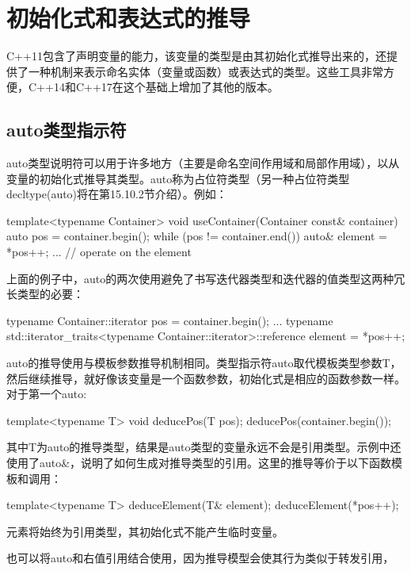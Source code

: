 \section{初始化式和表达式的推导}

C++11包含了声明变量的能力，该变量的类型是由其初始化式推导出来的，还提供了一种机制来表示命名实体（变量或函数）或表达式的类型。这些工具非常方便，C++14和C++17在这个基础上增加了其他的版本。

\subsection{auto类型指示符}

auto类型说明符可以用于许多地方（主要是命名空间作用域和局部作用域），以从变量的初始化式推导其类型。auto称为占位符类型（另一种占位符类型decltype(auto)将在第15.10.2节介绍）。例如：

\begin{cpp}
template<typename Container>
void useContainer(Container const& container) {
	auto pos = container.begin();
	while (pos != container.end()) {
		auto& element = *pos++;
		... // operate on the element
	}
}
\end{cpp}

上面的例子中，auto的两次使用避免了书写迭代器类型和迭代器的值类型这两种冗长类型的必要：

\begin{cpp}
typename Container::iterator pos = container.begin();
...
typename std::iterator_traits<typename Container::iterator>::reference
	element = *pos++;
\end{cpp}

auto的推导使用与模板参数推导机制相同。类型指示符auto取代模板类型参数T，然后继续推导，就好像该变量是一个函数参数，初始化式是相应的函数参数一样。对于第一个auto:

\begin{cpp}
template<typename T> void deducePos(T pos);
deducePos(container.begin());
\end{cpp}

其中T为auto的推导类型，结果是auto类型的变量永远不会是引用类型。示例中还使用了auto\&，说明了如何生成对推导类型的引用。这里的推导等价于以下函数模板和调用：

\begin{cpp}
template<typename T> deduceElement(T& element);
deduceElement(*pos++);
\end{cpp}

元素将始终为引用类型，其初始化式不能产生临时变量。

也可以将auto和右值引用结合使用，因为推导模型会使其行为类似于转发引用，

